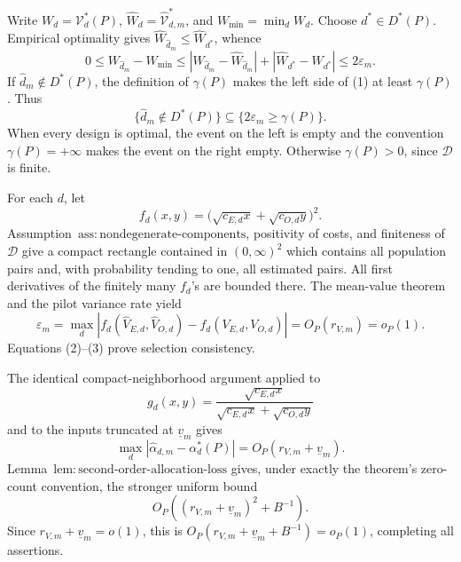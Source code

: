 Write \(W_d=\mathcal V_d^*(P)\), \(\widehat W_d=\widehat{\mathcal V}_{d,m}^*\), and \(W_{\min}=\min_dW_d\).  Choose \(d^*\in D^*(P)\).  Empirical optimality gives \(\widehat W_{\widehat d_m}\le\widehat W_{d^*}\), whence
\[
0\le W_{\widehat d_m}-W_{\min}
\le |W_{\widehat d_m}-\widehat W_{\widehat d_m}|
+|\widehat W_{d^*}-W_{d^*}|
\le2\varepsilon_m.                                                  \tag{1}
\]
If \(\widehat d_m\notin D^*(P)\), the definition of \(\gamma(P)\) makes the left side of (1) at least \(\gamma(P)\).  Thus
\[
\{\widehat d_m\notin D^*(P)\}\subseteq
\{2\varepsilon_m\ge\gamma(P)\}.                                  \tag{2}
\]
When every design is optimal, the event on the left is empty and the convention \(\gamma(P)=+\infty\) makes the event on the right empty.  Otherwise \(\gamma(P)>0\), since \(\mathcal D\) is finite.

For each \(d\), let
\[
f_d(x,y)=\bigl(\sqrt{c_{E,d}x}+\sqrt{c_{O,d}y}\bigr)^2.
\]
Assumption~\(\mathrm{ass{:}nondegenerate\text{-}components}\), positivity of costs, and finiteness of \(\mathcal D\) give a compact rectangle contained in \((0,\infty)^2\) which contains all population pairs and, with probability tending to one, all estimated pairs.  All first derivatives of the finitely many \(f_d\)'s are bounded there.  The mean-value theorem and the pilot variance rate yield
\[
\varepsilon_m
=\max_d|f_d(\widehat V_{E,d},\widehat V_{O,d})
-f_d(V_{E,d},V_{O,d})|=O_P(r_{V,m})=o_P(1).                         \tag{3}
\]
Equations (2)--(3) prove selection consistency.

The identical compact-neighborhood argument applied to
\[
g_d(x,y)=\frac{\sqrt{c_{E,d}x}}
{\sqrt{c_{E,d}x}+\sqrt{c_{O,d}y}}
\]
and to the inputs truncated at \(\underline v_m\) gives
\[
\max_d|\widehat\alpha_{d,m}-\alpha_d^*(P)|
=O_P(r_{V,m}+\underline v_m).                                      \tag{4}
\]
Lemma~\(\mathrm{lem{:}second\text{-}order\text{-}allocation\text{-}loss}\) gives, under exactly the theorem's zero-count convention, the stronger uniform bound
\[
O_P\!\left((r_{V,m}+\underline v_m)^2+B^{-1}\right).
\]
Since \(r_{V,m}+\underline v_m=o(1)\), this is
\(O_P(r_{V,m}+\underline v_m+B^{-1})=o_P(1)\), completing all assertions.